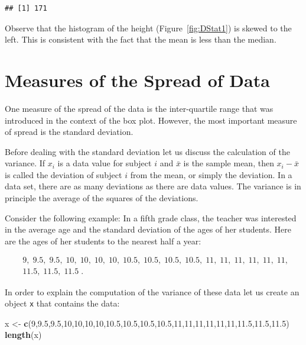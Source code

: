 \documentclass[]{krantz}
\makeatletter
\newenvironment{Shaded}{\begin{snugshade}}{\end{snugshade}}
\newcommand{\DecValTok}[1]{\textcolor[rgb]{0.00,0.00,0.81}{#1}}
\newcommand{\FloatTok}[1]{\textcolor[rgb]{0.00,0.00,0.81}{#1}}
\newcommand{\KeywordTok}[1]{\textcolor[rgb]{0.13,0.29,0.53}{\textbf{#1}}}
\newcommand{\NormalTok}[1]{#1}
\newcommand{\StringTok}[1]{\textcolor[rgb]{0.31,0.60,0.02}{#1}}
\newenvironment{kframe}{%
\medskip{}
\setlength{\fboxsep}{.8em}
 \def\at@end@of@kframe{}%
 \ifinner\ifhmode%
  \def\at@end@of@kframe{\end{minipage}}%
  \begin{minipage}{\columnwidth}%
 \fi\fi%
 \def\FrameCommand##1{\hskip\@totalleftmargin \hskip-\fboxsep
 \colorbox{shadecolor}{##1}\hskip-\fboxsep
     \hskip-\linewidth \hskip-\@totalleftmargin \hskip\columnwidth}%
 \MakeFramed {\advance\hsize-\width
   \@totalleftmargin\z@ \linewidth\hsize
   \@setminipage}}%
 {\par\unskip\endMakeFramed%
 \at@end@of@kframe}
\renewenvironment{Shaded}{\begin{kframe}}{\end{kframe}}
\theoremstyle{definition}
\theoremstyle{definition}
\theoremstyle{definition}
\theoremstyle{remark}
\makeatother
\begin{document}
\begin{verbatim}
## [1] 171
\end{verbatim}

Observe that the histogram of the height
(Figure~\ref{fig:DStat1}) is skewed to the left. This is
consistent with the fact that the mean is less than the median.

\hypertarget{measures-of-the-spread-of-data}{%
\section{Measures of the Spread of Data}\label{measures-of-the-spread-of-data}}

One measure of the spread of the data is the inter-quartile range that
was introduced in the context of the box plot. However, the most
important measure of spread is the standard deviation.

Before dealing with the standard deviation let us discuss the
calculation of the variance. If \(x_i\) is a data value for subject \(i\)
and \(\bar x\) is the sample mean, then \(x_i-\bar x\) is called the
deviation of subject \(i\) from the mean, or simply the deviation. In a
data set, there are as many deviations as there are data values. The
variance is in principle the average of the squares of the deviations.

Consider the following example: In a fifth grade class, the teacher was
interested in the average age and the standard deviation of the ages of
her students. Here are the ages of her students to the nearest half a
year:

\[\begin{aligned}
& 9,\; 9.5,\; 9.5,\; 10,\; 10,\; 10,\; 10,\; 10.5,\; 10.5,\; 10.5,\; 10.5,\; 11,\; 11,\; 11,\; 11,\; 11,\; 11,\;\\
& 11.5,\; 11.5,\; 11.5\;.\end{aligned}\]

In order to explain the computation of the variance of these data let us
create an object \texttt{x} that contains the data:

\begin{Shaded}
\begin{Highlighting}[]
\NormalTok{x <-}\StringTok{ }\KeywordTok{c}\NormalTok{(}\DecValTok{9}\NormalTok{,}\FloatTok{9.5}\NormalTok{,}\FloatTok{9.5}\NormalTok{,}\DecValTok{10}\NormalTok{,}\DecValTok{10}\NormalTok{,}\DecValTok{10}\NormalTok{,}\DecValTok{10}\NormalTok{,}\FloatTok{10.5}\NormalTok{,}\FloatTok{10.5}\NormalTok{,}\FloatTok{10.5}\NormalTok{,}\FloatTok{10.5}\NormalTok{,}\DecValTok{11}\NormalTok{,}\DecValTok{11}\NormalTok{,}\DecValTok{11}\NormalTok{,}\DecValTok{11}\NormalTok{,}\DecValTok{11}\NormalTok{,}\DecValTok{11}\NormalTok{,}\FloatTok{11.5}\NormalTok{,}\FloatTok{11.5}\NormalTok{,}\FloatTok{11.5}\NormalTok{)}
\KeywordTok{length}\NormalTok{(x)}
\end{Highlighting}
\end{Shaded}
\end{document}
